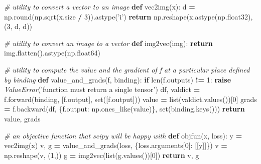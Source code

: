 \documentclass[]{book}
\newenvironment{Shaded}{\begin{snugshade}}{\end{snugshade}}
\newcommand{\KeywordTok}[1]{\textcolor[rgb]{0.13,0.29,0.53}{\textbf{#1}}}
\newcommand{\DecValTok}[1]{\textcolor[rgb]{0.00,0.00,0.81}{#1}}
\newcommand{\StringTok}[1]{\textcolor[rgb]{0.31,0.60,0.02}{#1}}
\newcommand{\CommentTok}[1]{\textcolor[rgb]{0.56,0.35,0.01}{\textit{#1}}}
\newcommand{\ControlFlowTok}[1]{\textcolor[rgb]{0.13,0.29,0.53}{\textbf{#1}}}
\newcommand{\OperatorTok}[1]{\textcolor[rgb]{0.81,0.36,0.00}{\textbf{#1}}}
\newcommand{\BuiltInTok}[1]{#1}
\newcommand{\PreprocessorTok}[1]{\textcolor[rgb]{0.56,0.35,0.01}{\textit{#1}}}
\newcommand{\NormalTok}[1]{#1}
\theoremstyle{definition}
\theoremstyle{definition}
\theoremstyle{definition}
\theoremstyle{remark}
\begin{document}
\begin{Shaded}
\begin{Highlighting}[]
\CommentTok{# utility to convert a vector to an image}
\KeywordTok{def}\NormalTok{ vec2img(x):}
\NormalTok{    d }\OperatorTok{=}\NormalTok{ np.}\BuiltInTok{round}\NormalTok{(np.sqrt(x.size }\OperatorTok{/} \DecValTok{3}\NormalTok{)).astype(}\StringTok{'i'}\NormalTok{)}
    \ControlFlowTok{return}\NormalTok{ np.reshape(x.astype(np.float32), (}\DecValTok{3}\NormalTok{, d, d))}

\CommentTok{# utility to convert an image to a vector}
\KeywordTok{def}\NormalTok{ img2vec(img):}
    \ControlFlowTok{return}\NormalTok{ img.flatten().astype(np.float64)}

\CommentTok{# utility to compute the value and the gradient of f at a particular place defined by binding}
\KeywordTok{def}\NormalTok{ value_and_grads(f, binding):}
    \ControlFlowTok{if} \BuiltInTok{len}\NormalTok{(f.outputs) }\OperatorTok{!=} \DecValTok{1}\NormalTok{:}
        \ControlFlowTok{raise} \PreprocessorTok{ValueError}\NormalTok{(}\StringTok{'function must return a single tensor'}\NormalTok{)}
\NormalTok{    df, valdict }\OperatorTok{=}\NormalTok{ f.forward(binding, [f.output], }\BuiltInTok{set}\NormalTok{([f.output]))}
\NormalTok{    value }\OperatorTok{=} \BuiltInTok{list}\NormalTok{(valdict.values())[}\DecValTok{0}\NormalTok{]}
\NormalTok{    grads }\OperatorTok{=}\NormalTok{ f.backward(df, \{f.output: np.ones_like(value)\}, }\BuiltInTok{set}\NormalTok{(binding.keys()))}
    \ControlFlowTok{return}\NormalTok{ value, grads}

\CommentTok{# an objective function that scipy will be happy with}
\KeywordTok{def}\NormalTok{ objfun(x, loss):}
\NormalTok{    y }\OperatorTok{=}\NormalTok{ vec2img(x)}
\NormalTok{    v, g }\OperatorTok{=}\NormalTok{ value_and_grads(loss, \{loss.arguments[}\DecValTok{0}\NormalTok{]: [[y]]\})}
\NormalTok{    v }\OperatorTok{=}\NormalTok{ np.reshape(v, (}\DecValTok{1}\NormalTok{,))}
\NormalTok{    g }\OperatorTok{=}\NormalTok{ img2vec(}\BuiltInTok{list}\NormalTok{(g.values())[}\DecValTok{0}\NormalTok{])}
    \ControlFlowTok{return}\NormalTok{ v, g}


\end{Highlighting}
\end{Shaded}
\end{document}
